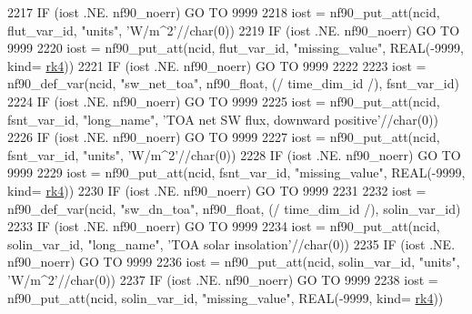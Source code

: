 \begin{DoxyCode}
{{2217     \textcolor{keywordflow}{IF} (iost .NE. nf90\_noerr) \textcolor{keywordflow}{GO TO} 9999
2218     iost    = nf90\_put\_att(ncid, flut\_var\_id, \textcolor{stringliteral}{"units"}, \textcolor{stringliteral}{'W/m^2'}//char(0))
2219     \textcolor{keywordflow}{IF} (iost .NE. nf90\_noerr) \textcolor{keywordflow}{GO TO} 9999
2220     iost    = nf90\_put\_att(ncid, flut\_var\_id, \textcolor{stringliteral}{"missing\_value"}, \textcolor{keywordtype}{REAL}(-9999, kind=
      \hyperlink{namespaceportable_abaed22a509442771d3fba69bebda0b33}{rk4}))
2221     \textcolor{keywordflow}{IF} (iost .NE. nf90\_noerr) \textcolor{keywordflow}{GO TO} 9999
2222 
2223     iost    = nf90\_def\_var(ncid, \textcolor{stringliteral}{"sw\_net\_toa"}, nf90\_float, (/ time\_dim\_id /), fsnt\_var\_id)
2224     \textcolor{keywordflow}{IF} (iost .NE. nf90\_noerr) \textcolor{keywordflow}{GO TO} 9999
2225     iost    = nf90\_put\_att(ncid, fsnt\_var\_id, \textcolor{stringliteral}{"long\_name"}, \textcolor{stringliteral}{'TOA net SW flux, downward positive'}//char(0))
2226     \textcolor{keywordflow}{IF} (iost .NE. nf90\_noerr) \textcolor{keywordflow}{GO TO} 9999
2227     iost    = nf90\_put\_att(ncid, fsnt\_var\_id, \textcolor{stringliteral}{"units"}, \textcolor{stringliteral}{'W/m^2'}//char(0))
2228     \textcolor{keywordflow}{IF} (iost .NE. nf90\_noerr) \textcolor{keywordflow}{GO TO} 9999
2229     iost    = nf90\_put\_att(ncid, fsnt\_var\_id, \textcolor{stringliteral}{"missing\_value"}, \textcolor{keywordtype}{REAL}(-9999, kind=
      \hyperlink{namespaceportable_abaed22a509442771d3fba69bebda0b33}{rk4}))
2230     \textcolor{keywordflow}{IF} (iost .NE. nf90\_noerr) \textcolor{keywordflow}{GO TO} 9999
2231 
2232     iost    = nf90\_def\_var(ncid, \textcolor{stringliteral}{"sw\_dn\_toa"}, nf90\_float, (/ time\_dim\_id /), solin\_var\_id)
2233     \textcolor{keywordflow}{IF} (iost .NE. nf90\_noerr) \textcolor{keywordflow}{GO TO} 9999
2234     iost    = nf90\_put\_att(ncid, solin\_var\_id, \textcolor{stringliteral}{"long\_name"}, \textcolor{stringliteral}{'TOA solar insolation'}//char(0))
2235     \textcolor{keywordflow}{IF} (iost .NE. nf90\_noerr) \textcolor{keywordflow}{GO TO} 9999
2236     iost    = nf90\_put\_att(ncid, solin\_var\_id, \textcolor{stringliteral}{"units"}, \textcolor{stringliteral}{'W/m^2'}//char(0))
2237     \textcolor{keywordflow}{IF} (iost .NE. nf90\_noerr) \textcolor{keywordflow}{GO TO} 9999
2238     iost    = nf90\_put\_att(ncid, solin\_var\_id, \textcolor{stringliteral}{"missing\_value"}, \textcolor{keywordtype}{REAL}(-9999, kind=
      \hyperlink{namespaceportable_abaed22a509442771d3fba69bebda0b33}{rk4}))
}}
\end{DoxyCode}
